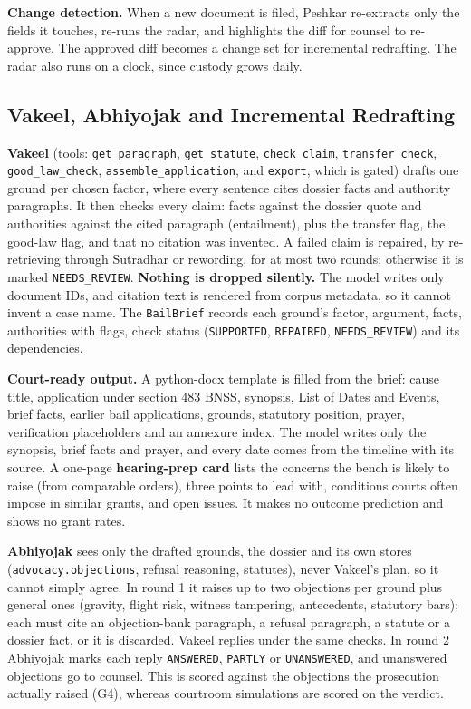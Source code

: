 \documentclass[10pt,a4paper]{article}
\newcommand{\st}[1]{\texttt{\small #1}}
\begin{document}
\textbf{Change detection.} When a new document is filed, Peshkar re-extracts only the fields it touches, re-runs the radar, and highlights the diff for counsel to re-approve. The approved diff becomes a change set for incremental redrafting. The radar also runs on a clock, since custody grows daily.

\subsection{Vakeel, Abhiyojak and Incremental Redrafting}

\textbf{Vakeel} (tools: \st{get\_\allowbreak{}paragraph}, \st{get\_\allowbreak{}statute}, \st{check\_\allowbreak{}claim}, \st{transfer\_\allowbreak{}check}, \st{good\_\allowbreak{}law\_\allowbreak{}check}, \st{assemble\_\allowbreak{}application}, and \st{export}, which is gated) drafts one ground per chosen factor, where every sentence cites dossier facts and authority paragraphs. It then checks every claim: facts against the dossier quote and authorities against the cited paragraph (entailment), plus the transfer flag, the good-law flag, and that no citation was invented. A failed claim is repaired, by re-retrieving through Sutradhar or rewording, for at most two rounds; otherwise it is marked \st{NEEDS\_\allowbreak{}REVIEW}. \textbf{Nothing is dropped silently.} The model writes only document IDs, and citation text is rendered from corpus metadata, so it cannot invent a case name. The \st{BailBrief} records each ground's factor, argument, facts, authorities with flags, check status (\st{SUPPORTED}, \st{REPAIRED}, \st{NEEDS\_\allowbreak{}REVIEW}) and its dependencies.

\textbf{Court-ready output.} A python-docx template is filled from the brief: cause title, application under section 483 BNSS, synopsis, List of Dates and Events, brief facts, earlier bail applications, grounds, statutory position, prayer, verification placeholders and an annexure index. The model writes only the synopsis, brief facts and prayer, and every date comes from the timeline with its source. A one-page \textbf{hearing-prep card} lists the concerns the bench is likely to raise (from comparable orders), three points to lead with, conditions courts often impose in similar grants, and open issues. It makes no outcome prediction and shows no grant rates.

\textbf{Abhiyojak} sees only the drafted grounds, the dossier and its own stores (\st{advocacy.objections}, refusal reasoning, statutes), never Vakeel's plan, so it cannot simply agree. In round 1 it raises up to two objections per ground plus general ones (gravity, flight risk, witness tampering, antecedents, statutory bars); each must cite an objection-bank paragraph, a refusal paragraph, a statute or a dossier fact, or it is discarded. Vakeel replies under the same checks. In round 2 Abhiyojak marks each reply \st{ANSWERED}, \st{PARTLY} or \st{UNANSWERED}, and unanswered objections go to counsel. This is scored against the objections the prosecution actually raised (G4), whereas courtroom simulations are scored on the verdict.
\end{document}
